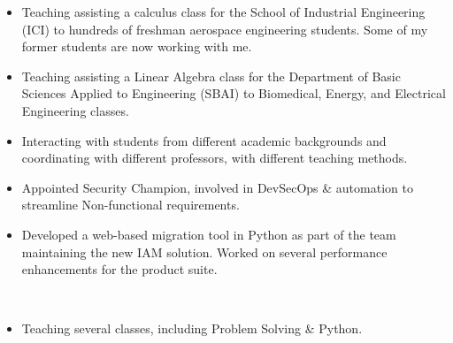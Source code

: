 	\newline
	\begin{itemize}
		\item Teaching assisting a calculus class for the School of Industrial Engineering (ICI) to hundreds of freshman aerospace engineering students. Some of my former students are now working with me.
		\item Teaching assisting a Linear Algebra class for the Department of Basic Sciences Applied to Engineering (SBAI) to Biomedical, Energy, and Electrical Engineering classes.
		\item Interacting with students from different academic backgrounds and coordinating with different professors, with different teaching methods.
	\end{itemize}
\else
	\newline
	\begin{itemize}
		\item Appointed Security Champion, involved in DevSecOps \& automation to streamline Non-functional requirements.
		\item Developed a web-based migration tool in Python as part of the team maintaining the new IAM solution. Worked on several performance enhancements for the product suite.
	\end{itemize}
	\smallskip
	 \\

	\divider

	\newline
	\begin{itemize}
		\item Teaching several classes, including Problem Solving \& Python.
	\end{itemize}

	\divider

	\newline

	\divider

	\newline

